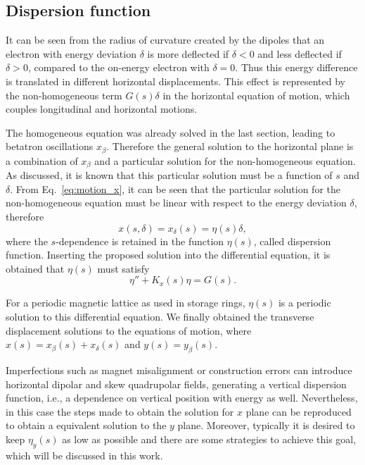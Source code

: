\subsection{Dispersion function}
It can be seen from the radius of curvature created by the dipoles that an electron with energy deviation $\delta$ is more deflected if $\delta < 0$ and less deflected if $\delta > 0$, compared to the on-energy electron with $\delta = 0$. Thus this energy difference is translated in different horizontal displacements. This effect is represented by the non-homogeneous term $G(s)\delta$ in the horizontal equation of motion, which couples longitudinal and horizontal motions.

The homogeneous equation was already solved in the last section, leading to betatron oscillations $x_{\beta}$. Therefore the general solution to the horizontal plane is a combination of $x_{\beta}$ and a particular solution for the non-homogeneous equation. As discussed, it is known that this particular solution must be a function of $s$ and $\delta$. From Eq.~\eqref{eq:motion_x}, it can be seen that the particular solution for the non-homogeneous equation must be linear with respect to the energy deviation $\delta$, therefore
\begin{equation}
    x(s, \delta) = x_{\delta}(s) = \eta(s) \delta,
\end{equation}
where the $s$-dependence is retained in the function $\eta(s)$, called dispersion function. Inserting the proposed solution into the differential equation, it is obtained that $\eta(s)$ must satisfy
\begin{equation}
    \eta'' + K_x(s)\eta = G(s).
    \label{eq:dispersion}
\end{equation}

For a periodic magnetic lattice as used in storage rings, $\eta(s)$ is a periodic solution to this differential equation. We finally obtained the transverse displacement solutions to the equations of motion, where $x(s) = x_{\beta}(s) + x_{\delta} (s)$ and $y(s) = y_{\beta}(s)$. 

Imperfections such as magnet misalignment or construction errors can introduce horizontal dipolar and skew quadrupolar fields, generating a vertical dispersion function, i.e., a dependence on vertical position with energy as well. Nevertheless, in this case the steps made to obtain the solution for $x$ plane can be reproduced to obtain a equivalent solution to the $y$ plane. Moreover, typically it is desired to keep $\eta_y(s)$ as low as possible and there are some strategies to achieve this goal, which will be discussed in this work.
